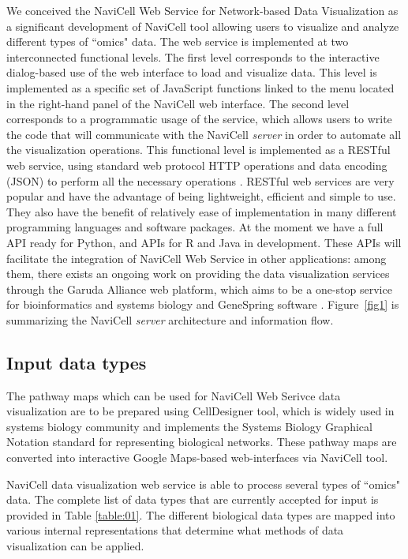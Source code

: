 \documentclass[a4,center,fleqn]{NAR}
\begin{document}
We conceived the NaviCell Web Service for Network-based Data Visualization
as a significant development of NaviCell tool \cite{kuperstein2013navicell} allowing
users to visualize and analyze different types of ``omics" data. The web service
is implemented at two interconnected functional levels.
The first level corresponds to the interactive dialog-based
use of the web interface to load and visualize data. This level is implemented
as a specific set of JavaScript functions linked to the menu located
in the right-hand panel of the NaviCell web interface. The second level corresponds to a
programmatic usage of the service, which allows users to write the code that will
communicate with the NaviCell \emph{server} in order to automate all the
visualization operations. This functional level is implemented as a RESTful web
service, using standard web protocol HTTP operations and data encoding (JSON)
to perform all the necessary operations \cite{fielding2002principled}.
RESTful web services are very popular and have the advantage of being
lightweight, efficient and simple to use. They also have the benefit of
relatively ease of implementation in many different programming languages and
software packages. At the moment we have a full API ready for Python, and
APIs for R and Java in development. These APIs will facilitate the
integration of NaviCell Web Service in other applications: among them, there exists an ongoing work on providing
the data visualization services through the Garuda Alliance web platform, which aims to be a one-stop service for
bioinformatics and systems biology \cite{ghosh2011software} and GeneSpring software \cite{Chu2001}. Figure~\ref{fig1} is
summarizing the NaviCell \emph{server} architecture and information flow.
\subsection{Input data types}

The pathway maps which can be used for NaviCell Web Serivce data visualization
are to be prepared using CellDesigner tool\cite{Funahashi2008}, which is widely used in systems biology
community and implements the Systems Biology Graphical Notation standard \cite{LeNovere2009}
for representing biological networks. These pathway maps are converted into
interactive Google Maps-based web-interfaces via NaviCell tool\cite{kuperstein2013navicell}.

NaviCell data visualization web service is able to process
several types of ``omics" data. The complete list of data types that are
currently accepted for input is provided in Table \ref{table:01}. The different biological data
types are mapped into various internal representations that determine what methods
of data visualization can be applied.
\end{document}
